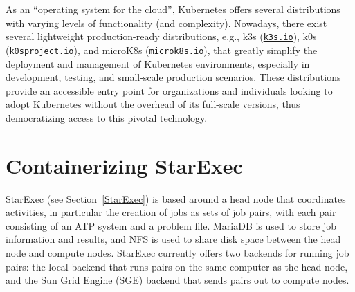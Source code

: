 \documentclass{easychair}
\begin{document}
As an ``operating system for the cloud'', Kubernetes offers several distributions with varying 
levels of functionality (and complexity). 
Nowadays, there exist several lightweight production-ready distributions, e.g., 
k3s (\href{https://k3s.io/}{\tt k3s.io}), k0s (\href{https://k0sproject.io/}{\tt k0sproject.io}), 
and microK8s (\href{https://microk8s.io/}{\tt microk8s.io}), that greatly simplify the deployment 
and management of Kubernetes environments, especially in development, testing, and small-scale 
production scenarios. 
These distributions provide an accessible entry point for organizations and individuals looking 
to adopt Kubernetes without the overhead of its full-scale versions, thus democratizing access 
to this pivotal technology.

\section{Containerizing StarExec}
\label{ContainerizingStarExec}

StarExec (see Section~\ref{StarExec}) is based around a head node that coordinates activities, 
in particular the creation of jobs as sets of job pairs, with each pair consisting of an ATP 
system and a problem file. 
MariaDB is used to store job information and results, and NFS is used to share disk space between 
the head node and compute nodes. 
StarExec currently offers two backends for running job pairs: the local backend that runs pairs on 
the same computer as the head node, and the Sun Grid Engine (SGE) backend that sends pairs out to 
compute nodes.
\end{document}
